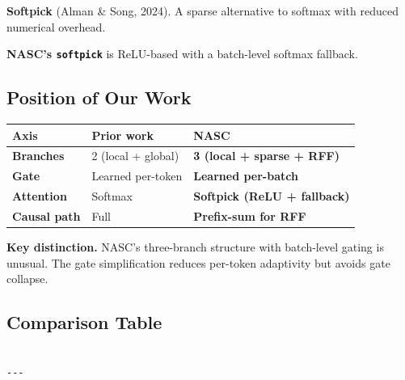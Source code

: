 \textbf{Softpick} (Alman \& Song, 2024). A sparse alternative to softmax with 
reduced numerical overhead.

\textbf{NASC's \texttt{softpick}} is ReLU-based with a batch-level softmax fallback.

\subsection{Position of Our Work}

\begin{table}[H]
\centering
\small
\begin{tabular}{lll}
\toprule
\textbf{Axis} & \textbf{Prior work} & \textbf{NASC} \\
\midrule
\textbf{Branches} & 2 (local + global) & \textbf{3 (local + sparse + RFF)} \\
\textbf{Gate} & Learned per-token & \textbf{Learned per-batch} \\
\textbf{Attention} & Softmax & \textbf{Softpick (ReLU + fallback)} \\
\textbf{Causal path} & Full & \textbf{Prefix-sum for RFF} \\
\bottomrule
\end{tabular}
\end{table}

\textbf{Key distinction.} NASC's three-branch structure with batch-level gating 
is unusual. The gate simplification reduces per-token adaptivity but 
avoids gate collapse.



\subsection{Comparison Table}

\begin{lstlisting}

---
\end{lstlisting}